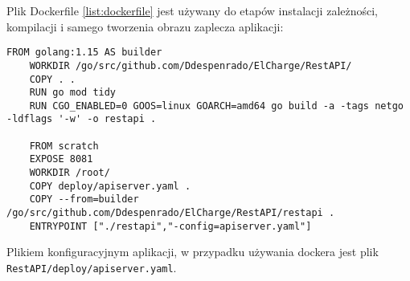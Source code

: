 Plik Dockerfile \ref{list:dockerfile} jest używany do etapów instalacji zależności, kompilacji i samego tworzenia obrazu zaplecza aplikacji:
\begin{lstlisting}[label=list:dockerfile,caption=Dockerfile,basicstyle=\tiny\ttfamily]
    FROM golang:1.15 AS builder
    WORKDIR /go/src/github.com/Ddespenrado/ElCharge/RestAPI/
    COPY . .
    RUN go mod tidy
    RUN CGO_ENABLED=0 GOOS=linux GOARCH=amd64 go build -a -tags netgo -ldflags '-w' -o restapi .
    
    FROM scratch
    EXPOSE 8081
    WORKDIR /root/
    COPY deploy/apiserver.yaml .
    COPY --from=builder /go/src/github.com/Ddespenrado/ElCharge/RestAPI/restapi .
    ENTRYPOINT ["./restapi","-config=apiserver.yaml"]
\end{lstlisting}

Plikiem konfiguracyjnym aplikacji, w przypadku używania dockera jest plik \texttt{RestAPI/deploy/apiserver.yaml}.
